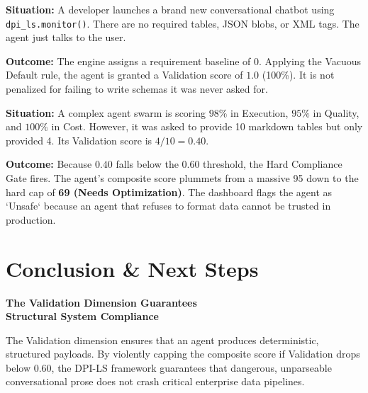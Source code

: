 \documentclass[11pt,a4paper]{article}
\begin{document}
\begin{tcolorbox}[enhanced, colback=blue!5!white, colframe=dpiblue, title={\textbf{Scenario 2: The Vacuous Start}}, fonttitle=\bfseries]
\textbf{Situation:} A developer launches a brand new conversational chatbot using \texttt{dpi\_ls.monitor()}. There are no required tables, JSON blobs, or XML tags. The agent just talks to the user.

\textbf{Outcome:} The engine assigns a requirement baseline of $0$. Applying the Vacuous Default rule, the agent is granted a Validation score of $1.0$ (100\%). It is not penalized for failing to write schemas it was never asked for.
\end{tcolorbox}

\begin{tcolorbox}[enhanced, colback=red!5!white, colframe=dpired, title={\textbf{Scenario 3: The Hard Gate Trigger}}, fonttitle=\bfseries]
\textbf{Situation:} A complex agent swarm is scoring $98\%$ in Execution, $95\%$ in Quality, and $100\%$ in Cost. However, it was asked to provide 10 markdown tables but only provided 4. Its Validation score is $4/10 = \mathbf{0.40}$.

\textbf{Outcome:} Because $0.40$ falls below the $0.60$ threshold, the Hard Compliance Gate fires. The agent's composite score plummets from a massive 95 down to the hard cap of \textbf{69 (Needs Optimization)}. The dashboard flags the agent as `Unsafe` because an agent that refuses to format data cannot be trusted in production.
\end{tcolorbox}

\newpage

\section{Conclusion \& Next Steps}

\begin{tcolorbox}[enhanced, colback=gray!5!white, colframe=dpiblue, boxrule=1pt, arc=0mm, drop shadow, top=5mm, bottom=5mm]
\begin{center}
\textbf{\large \textcolor{dpiblue}{The Validation Dimension Guarantees}}\\
\textbf{\large \textcolor{dpiblue}{Structural System Compliance}}
\end{center}
\vspace{0.3cm}
\begin{center}
The Validation dimension ensures that an agent produces deterministic, structured payloads. By violently capping the composite score if Validation drops below $0.60$, the DPI-LS framework guarantees that dangerous, unparseable conversational prose does not crash critical enterprise data pipelines.
\end{center}
\end{tcolorbox}
\end{document}
